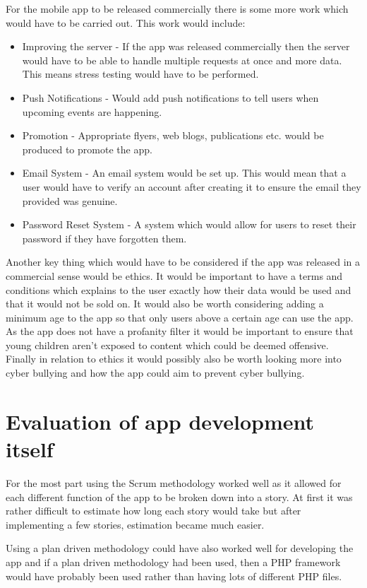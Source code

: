 For the mobile app to be released commercially there is some more work which would have to be carried out. This work would include:
\begin{itemize}
\item Improving the server - If the app was released commercially then the server would have to be able to handle multiple requests at once and more data. This means stress testing would have to be performed.
\item Push Notifications - Would add push notifications to tell users when upcoming events are happening.
\item Promotion - Appropriate flyers, web blogs, publications etc. would be produced to promote the app.
\item Email System - An email system would be set up. This would mean that a user would have to verify an account after creating it to ensure the email they provided was genuine.
\item Password Reset System - A system which would allow for users to reset their password if they have forgotten them.
\end{itemize} 
Another key thing which would have to be considered if the app was released in a commercial sense would be ethics. It would be important to have a terms and conditions which explains to the user exactly how their data would be used and that it would not be sold on. It would also be worth considering adding a minimum age to the app so that only users above a certain age can use the app. As the app does not have a profanity filter it would be important to ensure that young children aren't exposed to content which could be deemed offensive. Finally in relation to ethics it would possibly also be worth looking more into cyber bullying and how the app could aim to prevent cyber bullying.

\section{Evaluation of app development itself}
For the most part using the Scrum methodology worked well as it allowed for each different function of the app to be broken down into a story. At first it was rather difficult to estimate how long each story would take but after implementing a few stories, estimation became much easier.

Using a plan driven methodology could have also worked well for developing the app and if a plan driven methodology had been used, then a PHP framework would have probably been used rather than having lots of different PHP files. 

